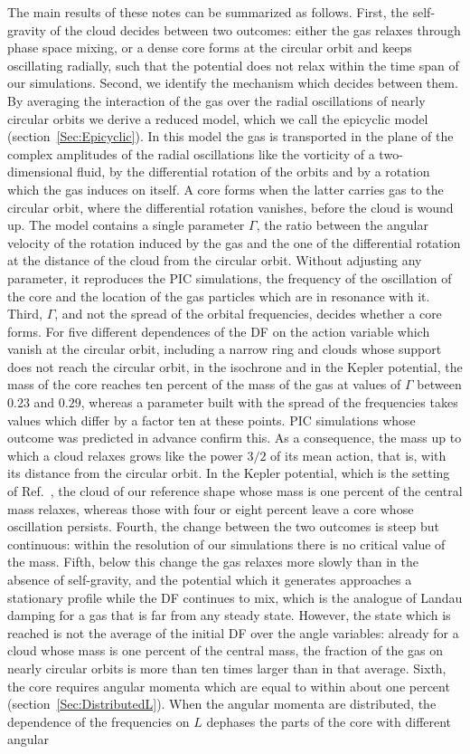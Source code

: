 The main results of these notes can be summarized as follows. First, the self-gravity of the cloud decides between two outcomes: either the gas relaxes through phase space mixing, or a dense core forms at the circular orbit and keeps oscillating radially, such that the potential does not relax within the time span of our simulations. Second, we identify the mechanism which decides between them. By averaging the interaction of the gas over the radial oscillations of nearly circular orbits we derive a reduced model, which we call the epicyclic model (section~\ref{Sec:Epicyclic}). In this model the gas is transported in the plane of the complex amplitudes of the radial oscillations like the vorticity of a two-dimensional fluid, by the differential rotation of the orbits and by a rotation which the gas induces on itself. A core forms when the latter carries gas to the circular orbit, where the differential rotation vanishes, before the cloud is wound up. The model contains a single parameter $\Gamma$, the ratio between the angular velocity of the rotation induced by the gas and the one of the differential rotation at the distance of the cloud from the circular orbit. Without adjusting any parameter, it reproduces the PIC simulations, the frequency of the oscillation of the core and the location of the gas particles which are in resonance with it. Third, $\Gamma$, and not the spread of the orbital frequencies, decides whether a core forms. For five different dependences of the DF on the action variable which vanish at the circular orbit, including a narrow ring and clouds whose support does not reach the circular orbit, in the isochrone and in the Kepler potential, the mass of the core reaches ten percent of the mass of the gas at values of $\Gamma$ between $0.23$ and $0.29$, whereas a parameter built with the spread of the frequencies takes values which differ by a factor ten at these points. PIC simulations whose outcome was predicted in advance confirm this. As a consequence, the mass up to which a cloud relaxes grows like the power $3/2$ of its mean action, that is, with its distance from the circular orbit. In the Kepler potential, which is the setting of Ref.~\cite{sCjL26}, the cloud of our reference shape whose mass is one percent of the central mass relaxes, whereas those with four or eight percent leave a core whose oscillation persists. Fourth, the change between the two outcomes is steep but continuous: within the resolution of our simulations there is no critical value of the mass. Fifth, below this change the gas relaxes more slowly than in the absence of self-gravity, and the potential which it generates approaches a stationary profile while the DF continues to mix, which is the analogue of Landau damping for a gas that is far from any steady state. However, the state which is reached is not the average of the initial DF over the angle variables: already for a cloud whose mass is one percent of the central mass, the fraction of the gas on nearly circular orbits is more than ten times larger than in that average. Sixth, the core requires angular momenta which are equal to within about one percent (section~\ref{Sec:DistributedL}). When the angular momenta are distributed, the dependence of the frequencies on $L$ dephases the parts of the core with different angular 
